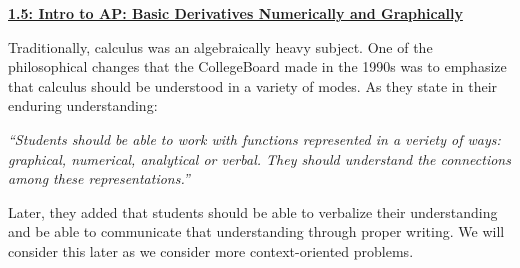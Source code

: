 \textbf{\underline{\large{1.5: Intro to AP: Basic Derivatives Numerically and Graphically}}} \par

Traditionally, calculus was an algebraically heavy subject. One of the philosophical changes that the CollegeBoard made in the 1990s was to emphasize that calculus should be understood in a variety of modes. As they state in their enduring understanding: \begin{center}
    \parbox{0.8\textwidth}{\textit{
        ``Students should be able to work with functions represented in a veriety of ways: graphical, numerical, analytical or verbal.  They should understand the connections among these representations.''}
    }
\end{center} \par

Later, they added that students should be able to verbalize their understanding and be able to communicate that understanding through proper writing. We will consider this later as we consider more context-oriented problems. \par
